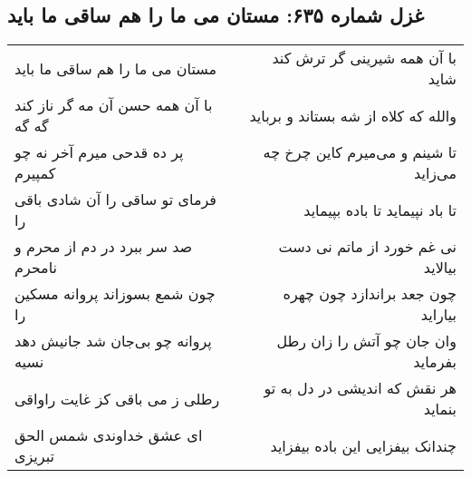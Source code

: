 \begin{center}
\section*{غزل شماره ۶۳۵: مستان می ما را هم ساقی ما باید}
\label{sec:0635}
\begin{longtable}{l p{0.5cm} r}
مستان می ما را هم ساقی ما باید
&&
با آن همه شیرینی گر ترش کند شاید
\\
با آن همه حسن آن مه گر ناز کند گه گه
&&
والله که کلاه از شه بستاند و برباید
\\
پر ده قدحی میرم آخر نه چو کمپیرم
&&
تا شینم و می‌میرم کاین چرخ چه می‌زاید
\\
فرمای تو ساقی را آن شادی باقی را
&&
تا باد نپیماید تا باده بپیماید
\\
صد سر ببرد در دم از محرم و نامحرم
&&
نی غم خورد از ماتم نی دست بیالاید
\\
چون شمع بسوزاند پروانه مسکین را
&&
چون جعد براندازد چون چهره بیاراید
\\
پروانه چو بی‌جان شد جانیش دهد نسیه
&&
وان جان چو آتش را زان رطل بفرماید
\\
رطلی ز می باقی کز غایت راواقی
&&
هر نقش که اندیشی در دل به تو بنماید
\\
ای عشق خداوندی شمس الحق تبریزی
&&
چندانک بیفزایی این باده بیفزاید
\\
\end{longtable}
\end{center}
